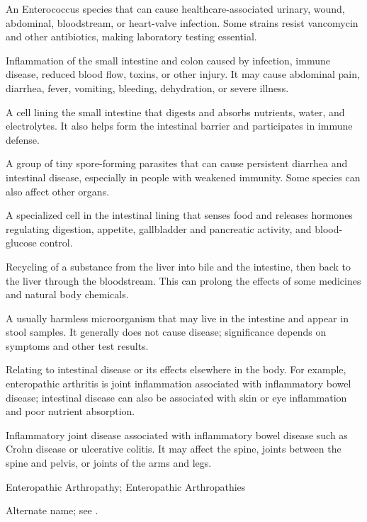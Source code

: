  An Enterococcus species that can cause healthcare-associated urinary, wound, abdominal, bloodstream, or heart-valve infection. Some strains resist vancomycin and other antibiotics, making laboratory testing essential.

 Inflammation of the small intestine and colon caused by infection, immune disease, reduced blood flow, toxins, or other injury. It may cause abdominal pain, diarrhea, fever, vomiting, bleeding, dehydration, or severe illness.

 A cell lining the small intestine that digests and absorbs nutrients, water, and electrolytes. It also helps form the intestinal barrier and participates in immune defense.

 A group of tiny spore-forming parasites that can cause persistent diarrhea and intestinal disease, especially in people with weakened immunity. Some species can also affect other organs.

 A specialized cell in the intestinal lining that senses food and releases hormones regulating digestion, appetite, gallbladder and pancreatic activity, and blood-glucose control.

 Recycling of a substance from the liver into bile and the intestine, then back to the liver through the bloodstream. This can prolong the effects of some medicines and natural body chemicals.

 A usually harmless microorganism that may live in the intestine and appear in stool samples. It generally does not cause disease; significance depends on symptoms and other test results.

 Relating to intestinal disease or its effects elsewhere in the body. For example, enteropathic arthritis is joint inflammation associated with inflammatory bowel disease; intestinal disease can also be associated with skin or eye inflammation and poor nutrient absorption.

 Inflammatory joint disease associated with inflammatory bowel disease such as Crohn disease or ulcerative colitis. It may affect the spine, joints between the spine and pelvis, or joints of the arms and legs.

\synonyms
Enteropathic Arthropathy; Enteropathic Arthropathies

 Alternate name; see .

